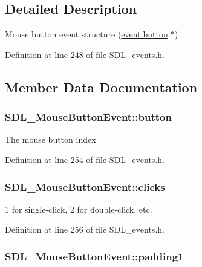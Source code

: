 \subsection{Detailed Description}
Mouse button event structure (\hyperlink{union_s_d_l___event_ab6da2fa2687e5f849f270adecc64785f}{event.\-button}.$\ast$) 

Definition at line 248 of file S\-D\-L\-\_\-events.\-h.



\subsection{Member Data Documentation}
\hypertarget{struct_s_d_l___mouse_button_event_a1a4680e19ae06d02d2093f0bcba1b24c}{
\subsubsection[{button}]{ S\-D\-L\-\_\-\-Mouse\-Button\-Event\-::button}}\label{struct_s_d_l___mouse_button_event_a1a4680e19ae06d02d2093f0bcba1b24c}
The mouse button index 

Definition at line 254 of file S\-D\-L\-\_\-events.\-h.

\hypertarget{struct_s_d_l___mouse_button_event_aa606bebcbc3ffc7e932016039c2a36a1}{
\subsubsection[{clicks}]{ S\-D\-L\-\_\-\-Mouse\-Button\-Event\-::clicks}}\label{struct_s_d_l___mouse_button_event_aa606bebcbc3ffc7e932016039c2a36a1}
1 for single-\/click, 2 for double-\/click, etc. 

Definition at line 256 of file S\-D\-L\-\_\-events.\-h.

\hypertarget{struct_s_d_l___mouse_button_event_a765957d218d16fa00558fa4d20e80689}{
\subsubsection[{padding1}]{ S\-D\-L\-\_\-\-Mouse\-Button\-Event\-::padding1}}\label{struct_s_d_l___mouse_button_event_a765957d218d16fa00558fa4d20e80689}


